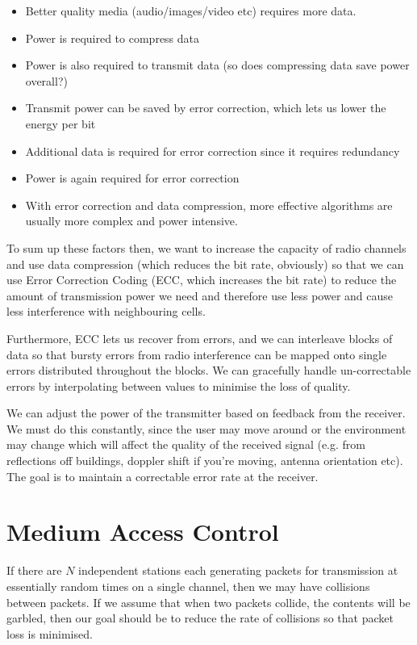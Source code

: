 \begin{mymulticols}
  \begin{itemize}
    \item Better quality media (audio/images/video etc) requires more data.
    \item Power is required to compress data
    \item Power is also required to transmit data (so does compressing data save
      power overall?)
    \item Transmit power can be saved by error correction, which lets us lower
      the energy per bit
    \item Additional data is required for error correction since it requires
      redundancy
    \item Power is again required for error correction
    \item With error correction and data compression, more effective algorithms
      are usually more complex and power intensive.
  \end{itemize}
\end{mymulticols}

To sum up these factors then, we want to increase the capacity of radio channels
and use data compression (which reduces the bit rate, obviously) so that we can
use Error Correction Coding (ECC, which increases the bit rate) to reduce the
amount of transmission power we need and therefore use less power and cause less
interference with neighbouring cells.

Furthermore, ECC lets us recover from errors, and we can interleave blocks of
data so that bursty errors from radio interference can be mapped onto single
errors distributed throughout the blocks. We can gracefully handle
un-correctable errors by interpolating between values to minimise the loss of
quality.

We can adjust the power of the transmitter based on feedback from the receiver.
We must do this constantly, since the user may move around or the environment
may change which will affect the quality of the received signal (e.g. from
reflections off buildings, doppler shift if you're moving, antenna orientation
etc). The goal is to maintain a correctable error rate at the receiver.


\section{Medium Access Control}

If there are $N$ independent stations each generating packets for transmission
at essentially random times on a single channel, then we may have collisions
between packets. If we assume that when two packets collide, the contents will
be garbled, then our goal should be to reduce the rate of collisions so that
packet loss is minimised.

